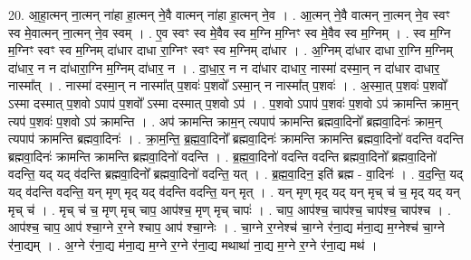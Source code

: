\documentclass[17pt]{extarticle}
\begin{document}
20. आ॒हा॒त्मन् ना॒त्मन् ना॑हा हा॒त्मन् ने॒वै वात्मन् ना॑हा हा॒त्मन् ने॒व । . आ॒त्मन् ने॒वै वात्मन् ना॒त्मन् ने॒व स्वꣳ स्व मे॒वात्मन् ना॒त्मन् ने॒व स्वम् । . ए॒व स्वꣳ स्व मे॒वैव स्व म॒ग्नि म॒ग्निꣳ स्व मे॒वैव स्व म॒ग्निम् । . स्व म॒ग्नि म॒ग्निꣳ स्वꣳ स्व म॒ग्निम् दा॑धार दाधा रा॒ग्निꣳ स्वꣳ स्व म॒ग्निम् दा॑धार । . अ॒ग्निम् दा॑धार दाधा रा॒ग्नि म॒ग्निम् दा॑धार॒ न न दा॑धारा॒ग्नि म॒ग्निम् दा॑धार॒ न । . दा॒धा॒र॒ न न दा॑धार दाधार॒ नास्मा॑ दस्मा॒न् न दा॑धार दाधार॒ नास्मा᳚त् । . नास्मा॑ दस्मा॒न् न नास्मा᳚त् प॒शवः॑ प॒शवो᳚ ऽस्मा॒न् न नास्मा᳚त् प॒शवः॑ । . अ॒स्मा॒त् प॒शवः॑ प॒शवो᳚ ऽस्मा दस्मात् प॒शवो ऽपाप॑ प॒शवो᳚ ऽस्मा दस्मात् प॒शवो ऽप॑ । . प॒शवो ऽपाप॑ प॒शवः॑ प॒शवो ऽप॑ क्रामन्ति क्राम॒न् त्यप॑ प॒शवः॑ प॒शवो ऽप॑ क्रामन्ति । . अप॑ क्रामन्ति क्राम॒न् त्यपाप॑ क्रामन्ति ब्रह्मवा॒दिनो᳚ ब्रह्मवा॒दिनः॑ क्राम॒न् त्यपाप॑ क्रामन्ति ब्रह्मवा॒दिनः॑ । . क्रा॒म॒न्ति॒ ब्र॒ह्म॒वा॒दिनो᳚ ब्रह्मवा॒दिनः॑ क्रामन्ति क्रामन्ति ब्रह्मवा॒दिनो॑ वदन्ति वदन्ति ब्रह्मवा॒दिनः॑ क्रामन्ति क्रामन्ति ब्रह्मवा॒दिनो॑ वदन्ति । . ब्र॒ह्म॒वा॒दिनो॑ वदन्ति वदन्ति ब्रह्मवा॒दिनो᳚ ब्रह्मवा॒दिनो॑ वदन्ति॒ यद् यद् व॑दन्ति ब्रह्मवा॒दिनो᳚ ब्रह्मवा॒दिनो॑ वदन्ति॒ यत् । . ब्र॒ह्म॒वा॒दिन॒ इति॑ ब्रह्म - वा॒दिनः॑ । . व॒द॒न्ति॒ यद् यद् व॑दन्ति वदन्ति॒ यन् मृण् मृद् यद् व॑दन्ति वदन्ति॒ यन् मृत् । . यन् मृण् मृद् यद् यन् मृच् च॑ च॒ मृद् यद् यन् मृच् च॑ । . मृच् च॑ च॒ मृण् मृच् चाप॒ आप॑श्च॒ मृण् मृच् चापः॑ । . चाप॒ आप॑श्च॒ चाप॑श्च॒ चाप॑श्च॒ चाप॑श्च । . आप॑श्च॒ चाप॒ आप॑ श्चा॒ग्ने र॒ग्ने श्चाप॒ आप॑ श्चा॒ग्नेः । . चा॒ग्ने र॒ग्नेश्च॑ चा॒ग्ने र॑ना॒द्य म॑ना॒द्य म॒ग्नेश्च॑ चा॒ग्ने र॑ना॒द्यम् । . अ॒ग्ने र॑ना॒द्य म॑ना॒द्य म॒ग्ने र॒ग्ने र॑ना॒द्य मथाथा॑ ना॒द्य म॒ग्ने र॒ग्ने र॑ना॒द्य मथ॑ । \newline
\end{document}
